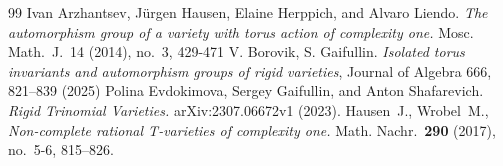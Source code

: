 \documentclass[10pt,a4paper]{amsart}
\begin{document}
\begin{thebibliography}{99}
 Ivan Arzhantsev, J\"urgen Hausen, Elaine Herppich, and Alvaro Liendo. \emph{The automorphism group of a variety with torus action of complexity one.} Mosc. Math.~J.~14 (2014), no.~3, 429-471
 V. Borovik, S. Gaifullin. \emph{Isolated torus invariants and automorphism groups of rigid varieties}, Journal of Algebra 666, 821--839 (2025)
 Polina Evdokimova, Sergey Gaifullin, and Anton Shafarevich. {\it Rigid Trinomial Varieties.} arXiv:2307.06672v1 (2023).
 Hausen~J., Wrobel~M., \emph{Non-complete rational T-varieties of complexity one.} Math. Nachr.~{\bf 290} (2017), no.~5-6, 815--826.
\end{thebibliography}
\end{document}

